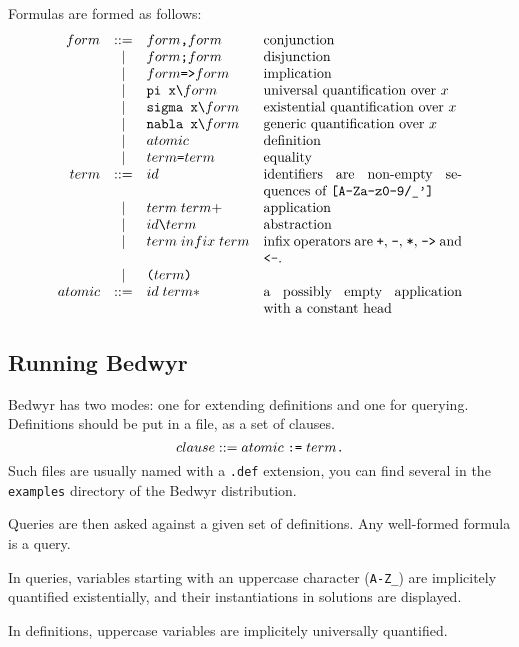 \documentclass{article}
\begin{document}
Formulas are formed as follows:
\[\begin{array}{rclp{5cm}}
form &::=& form \texttt{,}  form & conjunction \\
     & | & form \texttt{;}  form & disjunction \\
     & | & form \texttt{=>} form & implication \\
     & | & \verb.pi x\.    form  & universal quantification over $x$ \\
     & | & \verb.sigma x\. form  & existential quantification over $x$ \\
     & | & \verb.nabla x\. form  & generic quantification over $x$ \\
     & | & atomic & definition \\
     & | & term \verb.=. term & equality \\
term &::=& id & identifiers are non-empty sequences of \verb.[A-Za-z0-9/_']. \\
     & | & term \; term+ & application \\
     & | & id \verb.\. term & abstraction \\
     & | & term \; infix \; term & infix operators are
             \verb.+., \verb.-., \verb.*., \verb.->. and \verb.<-.. \\
     & | & \verb.(. term \verb.). & \\
atomic &::=& id \; term* & a possibly empty application with a constant head \\
\end{array}\]

\subsection{Running Bedwyr}

Bedwyr has two modes: one for extending definitions and one for querying.
Definitions should be put in a file, as a set of clauses.
\[ clause ::= atomic \;\verb.:=.\; term \verb|.| \]
Such files are usually named with a \verb|.def| extension, you can find several
in the \verb.examples. directory of the Bedwyr distribution.

Queries are then asked against a given set of definitions.
Any well-formed formula is a query.

In queries, variables starting with an uppercase character (\verb.A-Z_.)
are implicitely quantified existentially, and their instantiations in solutions
are displayed.

In definitions, uppercase variables are implicitely universally quantified.
\end{document}
